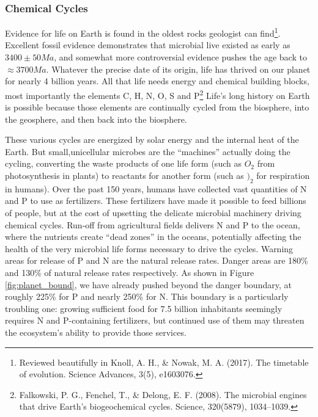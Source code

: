 \documentclass[amstex,12pt]{book}
\begin{document}
\subsubsection{Chemical Cycles}
Evidence for life on Earth is found in the oldest rocks geologist can find\footnote{Reviewed beautifully in Knoll, A. H., \& Nowak, M. A. (2017). The timetable of evolution. Science Advances, 3(5), e1603076.}. Excellent fossil evidence demonstrates that microbial live existed as early as $3400\pm 50 Ma$, and somewhat more controversial evidence pushes the age back to $\approx 3700 Ma$. Whatever the precise date of its origin, life has thrived on our planet for nearly 4 billion years. All that life needs energy and chemical building blocks, most importantly the elements C, H, N, O, S and P\footnote{Falkowski, P. G., Fenchel, T., \& Delong, E. F. (2008). The microbial engines that drive Earth’s biogeochemical cycles. Science, 320(5879), 1034–1039.} Life's long history on Earth is possible because those elements are continually cycled from the biosphere, into the geosphere, and then back into the biosphere.

These various cycles are energized by solar energy and the internal heat of the Earth. But small,unicellular microbes are the ``machines'' actually doing the cycling, converting the waste products of one life form (such as $O_2$ from photosynthesis in plants) to reactants for another form (such as $)_2$ for respiration in humans). Over the past 150 years, humans have collected vast quantities of N and P to use as fertilizers. These fertilizers have made it possible to feed billions of people, but at the cost of upsetting the delicate microbial machinery driving chemical cycles. Run-off from agricultural fields delivers N and P to the ocean, where the nutrients create ``dead zones'' in the oceans, potentially affecting the health of
the very microbial life forms necessary to drive the cycles. Warning areas for release of P and N are the natural release rates. Danger areas are 180\% and 130\% of natural release rates respectively. As shown in Figure \ref{fig:planet_bound}, we have already pushed beyond the danger boundary, at roughly 225\% for P and  nearly 250\% for N. This boundary is a particularly troubling one: growing sufficient food for 7.5 billion inhabitants seemingly requires N and P-containing fertilizers, but continued use of them may threaten the ecosystem's ability to provide those services.
\end{document}
